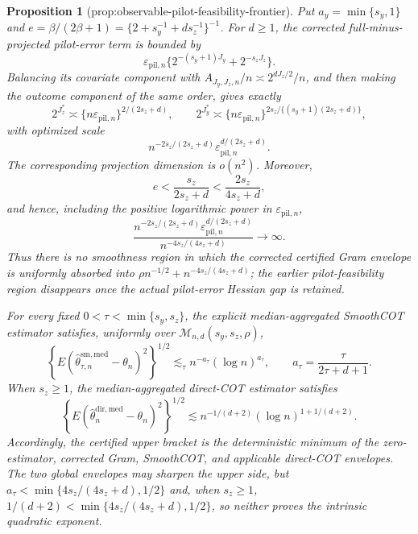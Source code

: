 \documentclass{article}
\newtheorem{proposition}{Proposition}
\begin{document}
\begin{proposition}[prop:observable-pilot-feasibility-frontier]\label{prop:observable-pilot-feasibility-frontier}
Put \(a_y=\min\{s_y,1\}\) and \(e=\beta/(2\beta+1)=\{2+s_y^{-1}+ds_z^{-1}\}^{-1}\). For \(d\ge1\), the corrected full-minus-projected pilot-error term is bounded by
\[
\varepsilon_{\mathrm{pil},n}\{2^{-(s_y+1)J_y}+2^{-s_zJ_z}\}.
\]
Balancing its covariate component with \(A_{J_y,J_z,n}/n\asymp2^{dJ_z/2}/n\), and then making the outcome component of the same order, gives exactly
\[
2^{J_z^*}\asymp\{n\varepsilon_{\mathrm{pil},n}\}^{2/(2s_z+d)},
\qquad
2^{J_y^*}\asymp\{n\varepsilon_{\mathrm{pil},n}\}^{2s_z/\{(s_y+1)(2s_z+d)\}},
\]
with optimized scale
\[
n^{-2s_z/(2s_z+d)}\varepsilon_{\mathrm{pil},n}^{d/(2s_z+d)}.
\]
The corresponding projection dimension is \(o(n^2)\).  Moreover,
\[
e<\frac{s_z}{2s_z+d}<\frac{2s_z}{4s_z+d},
\]
and hence, including the positive logarithmic power in \(\varepsilon_{\mathrm{pil},n}\),
\[
\frac{n^{-2s_z/(2s_z+d)}\varepsilon_{\mathrm{pil},n}^{d/(2s_z+d)}}{n^{-4s_z/(4s_z+d)}}\longrightarrow\infty.
\]
Thus there is no smoothness region in which the corrected certified Gram envelope is uniformly absorbed into \(\rho n^{-1/2}+n^{-4s_z/(4s_z+d)}\); the earlier pilot-feasibility region disappears once the actual pilot-error Hessian gap is retained.

For every fixed \(0<\tau<\min\{s_y,s_z\}\), the explicit median-aggregated SmoothCOT estimator satisfies, uniformly over \(\mathcal M_{n,d}(s_y,s_z,\rho)\),
\[
\left\{E(\widehat\theta^{\mathrm{sm,med}}_{\tau,n}-\theta_n)^2\right\}^{1/2}
\lesssim_\tau n^{-a_\tau}(\log n)^{a_\tau},
\qquad a_\tau=\frac{\tau}{2\tau+d+1}.
\]
When \(s_z\ge1\), the median-aggregated direct-COT estimator satisfies
\[
\left\{E(\widehat\theta_n^{\mathrm{dir,med}}-\theta_n)^2\right\}^{1/2}
\lesssim n^{-1/(d+2)}(\log n)^{1+1/(d+2)}.
\]
Accordingly, the certified upper bracket is the deterministic minimum of the zero-estimator, corrected Gram, SmoothCOT, and applicable direct-COT envelopes.  The two global envelopes may sharpen the upper side, but \(a_\tau<\min\{4s_z/(4s_z+d),1/2\}\) and, when \(s_z\ge1\), \(1/(d+2)<\min\{4s_z/(4s_z+d),1/2\}\), so neither proves the intrinsic quadratic exponent.
\end{proposition}
\end{document}
